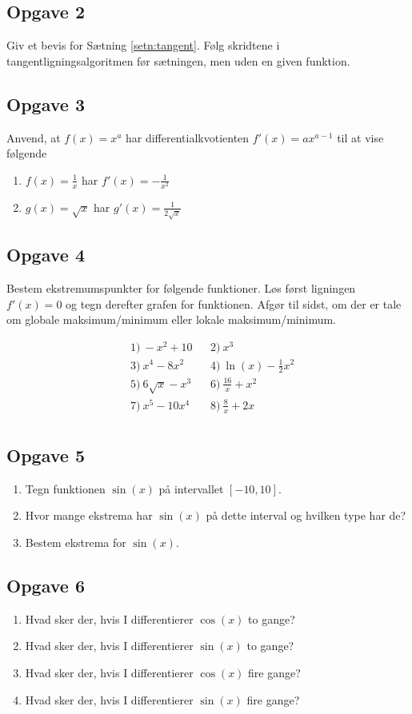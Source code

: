 \subsection*{Opgave 2}
Giv et bevis for Sætning \ref{setn:tangent}. Følg skridtene i tangentligningsalgoritmen før sætningen, men uden en given funktion.
	
	
\subsection*{Opgave 3}
Anvend, at $f(x) = x^a$ har differentialkvotienten $f'(x) = ax^{a-1}$ til at vise følgende
\begin{enumerate}[label=\roman*)]
	\item $f(x) = \frac{1}{x}$ har $f'(x) = -\frac{1}{x^2}$
	\item $g(x) = \sqrt{x}$ har $g'(x) = \frac{1}{2\sqrt{x}}$
\end{enumerate}

\subsection*{Opgave 4}

Bestem ekstremumspunkter for følgende funktioner. Løs først ligningen $f'(x)=0$ og tegn derefter grafen for funktionen.  Afgør til sidst, om der er tale om globale maksimum/minimum eller lokale maksimum/minimum.

\begin{align*}
	&1) \ -x^2+10    &&2) \  x^3     \\
	&3) \  x^4-8x^2   &&4) \ \ln(x) - \frac{1}{2}x^2      \\
	&5) \ 6\sqrt{x}-x^3    &&6) \   \frac{16}{x} +x^2    \\
	&7) \  x^5-10x^4   &&8) \ \frac{8}{x} + 2x      \\
\end{align*}

\subsection*{Opgave 5}
\begin{enumerate}[label=\roman*)]
	\item Tegn funktionen $\sin(x)$ på intervallet $[-10,10]$.
	\item Hvor mange ekstrema har $\sin(x)$ på dette interval og hvilken type har de?
	\item Bestem ekstrema for $\sin(x)$.
\end{enumerate}

\subsection*{Opgave 6}
\begin{enumerate}[label=\roman*)]
	\item Hvad sker der, hvis I differentierer $\cos(x)$ to gange?
	\item Hvad sker der, hvis I differentierer $\sin(x)$ to gange?
	\item Hvad sker der, hvis I differentierer $\cos(x)$ fire gange?
	\item Hvad sker der, hvis I differentierer $\sin(x)$ fire gange?
\end{enumerate}